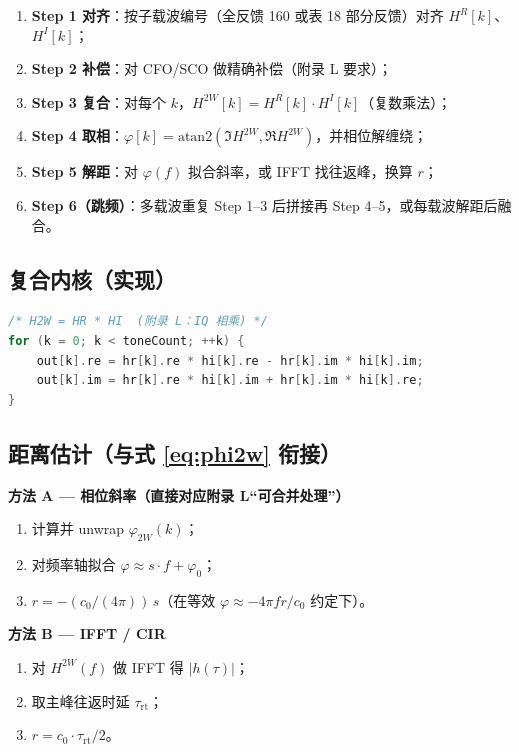 \documentclass[11pt,a4paper]{ctexart}
\begin{document}
\begin{enumerate}[nosep]
  \item \textbf{Step 1 对齐}：按子载波编号（全反馈 160 或表 18 部分反馈）对齐 $H^{R}[k]$、$H^{I}[k]$；
  \item \textbf{Step 2 补偿}：对 CFO/SCO 做精确补偿（附录 L 要求）；
  \item \textbf{Step 3 复合}：对每个 $k$，$H^{2W}[k]=H^{R}[k]\cdot H^{I}[k]$（复数乘法）；
  \item \textbf{Step 4 取相}：$\varphi[k]=\mathrm{atan2}(\Im H^{2W},\Re H^{2W})$，并相位解缠绕；
  \item \textbf{Step 5 解距}：对 $\varphi(f)$ 拟合斜率，或 IFFT 找往返峰，换算 $r$；
  \item \textbf{Step 6（跳频）}：多载波重复 Step 1--3 后拼接再 Step 4--5，或每载波解距后融合。
\end{enumerate}

\subsection{复合内核（实现）}

\begin{lstlisting}[language=C,caption={slbCalculateCompositeCsi 内核}]
/* H2W = HR * HI  (附录 L：IQ 相乘) */
for (k = 0; k < toneCount; ++k) {
    out[k].re = hr[k].re * hi[k].re - hr[k].im * hi[k].im;
    out[k].im = hr[k].re * hi[k].im + hr[k].im * hi[k].re;
}
\end{lstlisting}

\subsection{距离估计（与式 \eqref{eq:phi2w} 衔接）}

\textbf{方法 A — 相位斜率（直接对应附录 L``可合并处理''）}
\begin{enumerate}[nosep]
  \item 计算并 unwrap $\varphi_{2W}(k)$；
  \item 对频率轴拟合 $\varphi\approx s\cdot f+\varphi_0$；
  \item $r=-(c_0/(4\pi))\,s$（在等效 $\varphi\approx-4\pi f r/c_0$ 约定下）。
\end{enumerate}

\textbf{方法 B — IFFT / CIR}
\begin{enumerate}[nosep]
  \item 对 $H^{2W}(f)$ 做 IFFT 得 $|h(\tau)|$；
  \item 取主峰往返时延 $\tau_{\mathrm{rt}}$；
  \item $r=c_0\cdot\tau_{\mathrm{rt}}/2$。
\end{enumerate}
\end{document}
